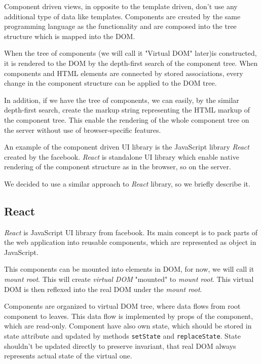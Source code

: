 	Component driven views, in opposite to the template driven, don't use any additional type of data like templates. 
	Components are created by the same programming language as the functionality and 
	are composed into the tree structure which is mapped into the DOM. 

	When the tree of components (we will call it "Virtual DOM" later)is constructed, 
	it is rendered to the DOM by the depth-first search of the component tree.
	When components and HTML elements are connected by stored associations, 
	every change in the component structure can be applied to the DOM tree. 

	In addition, if we have the tree of components, we can easily, by the similar depth-first search, 
	create the markup string representing the HTML markup of the component tree.
	This enable the rendering of the whole component tree on the server without use of browser-specific features.

	An example of the component driven UI library is the JavaScript library \textit{React} created by the facebook.
  \textit{React} is standalone UI library which enable native rendering of the component structure as in the browser, so on the server.

	We decided to use a similar approach to \textit{React} library, so we briefly describe it.

	\subsection{React}\label{subsec:existing-component-react}
		
		\textit{React} is JavaScript UI library from facebook. 
		Its main concept is to pack parts of the web application into reusable components, 
		which are represented as object in JavaScript. 

		This components can be mounted into elements in DOM, for now, we will call it \textit{mount root}. 
		This will create \textit{virtual DOM} "mounted" to \textit{mount root}. 
		This virtual DOM is then reflexed into the real DOM under the \textit{mount root}.

		Components are organized to virtual DOM tree, where data flows from root component to leaves. 
		This data flow is implemented by props of the component, which are read-only.
		Component have also own state, which should be stored in state attribute and updated by methods \texttt{setState} and \texttt{replaceState}. 
		State shouldn't be updated directly to preserve invariant, that real DOM always represents actual state of the virtual one. 

